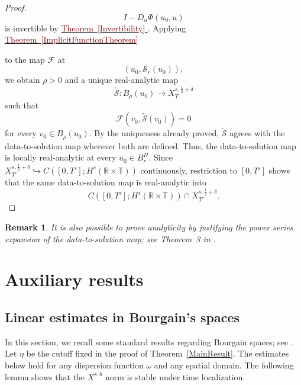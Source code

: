 \documentclass[12pt,oneside,reqno]{amsart}
\newcommand{\thmref}[1]{%
    \hyperref[#1]{%
        \textcolor{Maroon}{Theorem~\ref*{#1}}%
    }%
}
\numberwithin{equation}{section}
\theoremstyle{plain}
\newtheorem{remark}[theorem]{Remark}
\def\R{{\mathbb R}}
\def\T{{\mathbb T}}
\newcommand{\prc}[1]{%
    \left(#1\right)
}
\newcommand{\rt}{\R\times\T}
\begin{document}
\begin{proof}
\begin{equation}
    I-D_u\Phi(u_0,u)
\end{equation}
is invertible by
\thmref{Invertibility}.
Applying
\thmref{ImplicitFunctionTheorem}
to the map $\mathcal F$ at
\begin{equation}
    \prc{
        u_0,
        \mathcal S_r(u_0)
    },
\end{equation}
we obtain $\rho>0$ and a unique real-analytic map
\begin{equation}
    \widetilde{\mathcal S}:
    B_\rho(u_0)
    \longrightarrow
    X_T^{s,\frac12+\delta}
\end{equation}
such that
\begin{equation}
    \mathcal F
    \prc{
        v_0,
        \widetilde{\mathcal S}(v_0)
    }
    =
    0
\end{equation}
for every $v_0\in B_\rho(u_0)$. By the uniqueness already proved,
$\widetilde{\mathcal S}$ agrees with the data-to-solution map wherever both
are defined. Thus, the data-to-solution map is locally real-analytic at every
$u_0\in B_r^H$. Since
$X_{T'}^{s,\frac12+\delta}
\hookrightarrow C([0,T'];H^s(\rt))$
continuously, restriction to $[0,T']$ shows that the same
data-to-solution map is real-analytic into
\begin{equation*}
    C([0,T'];H^s(\rt))
    \cap
    X_{T'}^{s,\frac12+\delta}.
\end{equation*}
\end{proof}

\begin{remark}
It is also possible to prove analyticity by justifying the power series
expansion of the data-to-solution map; see Theorem~3 in
\cite{bejenaru2006sharp}.
\end{remark}



\appendix
\section{Auxiliary results}
\subsection{Linear estimates in Bourgain's spaces}
In this section, we recall some standard results regarding Bourgain spaces; see \cite{ginibre1995probleme}. Let $\eta$ be the cutoff fixed in the proof of Theorem~\ref{MainResult}. The estimates below hold for any dispersion function $\omega$ and any spatial domain. The following lemma shows that the $X^{s,b}$ norm is stable under time localization.
\end{document}
